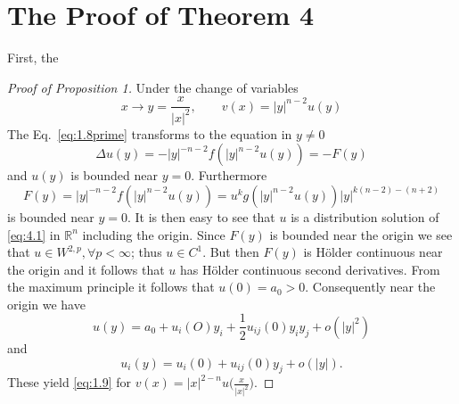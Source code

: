 \section{The Proof of Theorem 4}\label{sec:4}
First, the
\begin{proof}[Proof of Proposition 1]
	Under the change of variables
	\[x\rightarrow y=\frac{x}{|x|^2},\qquad v(x)=|y|^{n-2}u(y)\]
	The Eq.~\eqref{eq:1.8prime} transforms to the equation in $y\neq0$
	\begin{equation}\label{eq:4.1}
		\Delta u(y) = - |y|^{-n-2} f(|y|^{n-2}u(y)) = - F(y)
	\end{equation}
	and $u(y)$ is bounded near $y = 0$. Furthermore
	\[ F(y) = |y|^{-n-2} f(|y|^{n-2}u(y)) = u^k g(|y|^{n-2}u(y))|y|^{k(n-2)-(n + 2)} \]
	is bounded near $y=0$. It is then easy to see that $u$ is a distribution solution
  of \eqref{eq:4.1} in $\mathbb{R}^n$ including the origin. Since $F(y)$ 
  is bounded near the origin we see that $u\in W^{2,p}, \forall p < \infty$;
  thus $u\in C^1$. But then $F(y)$ is H\"older continuous near the origin and it follows 
  that $u$ has H\"older continuous second derivatives. From the maximum principle 
  it follows that $u(0)= a_0 > 0$. Consequently near the origin we have
	\[u(y) = a_0 + u_i(O)y_i + \frac12 u_{ij}(0)y_iy_j + o(|y|^2)\]
	and
	\[u_i(y) = u_i(0) + u_{ij}(0)y_j + o(|y|).\]
	These yield \eqref{eq:1.9} for $v(x)=|x|^{2-n}u\bigl(\frac{x}{|x|^2}\bigr)$.
\end{proof}


